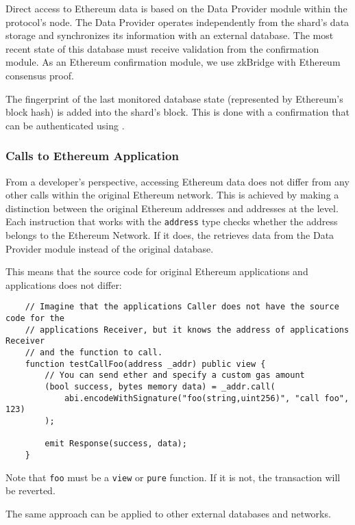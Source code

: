 Direct access to Ethereum data is based on the 
Data Provider module within the protocol's node.
The Data Provider operates independently from the shard's data storage 
and synchronizes its information with an external database. 
The most recent state of this database must receive validation 
from the confirmation module. 
As an Ethereum confirmation module, we use zkBridge 
with Ethereum consensus proof.

The fingerprint of the last monitored database state 
(represented by Ethereum's block hash) is added into the shard's block. 
This is done with a confirmation that can be authenticated using \evm. 

\subsubsection{Calls to Ethereum Application}
From a developer's perspective, accessing Ethereum data does not differ 
from any other calls within the original Ethereum network. 
This is achieved by making a distinction between the original Ethereum 
addresses and \protocol addresses at the \evm level. 
Each \evm instruction that works with the \texttt{address} type 
checks whether the address belongs to the Ethereum Network.
If it does, the \evm retrieves data from the Data Provider module instead of 
the original database.

This means that the source code for original Ethereum applications 
and \protocol applications does not differ:

\begin{verbatim}
    // Imagine that the applications Caller does not have the source code for the
    // applications Receiver, but it knows the address of applications Receiver 
    // and the function to call.
    function testCallFoo(address _addr) public view {
        // You can send ether and specify a custom gas amount
        (bool success, bytes memory data) = _addr.call(
            abi.encodeWithSignature("foo(string,uint256)", "call foo", 123)
        );

        emit Response(success, data);
    }
\end{verbatim}

Note that \texttt{foo} must be a \texttt{view} or \texttt{pure} function. 
If it is not, the transaction will be reverted.


The same approach can be applied to other external databases and networks.
